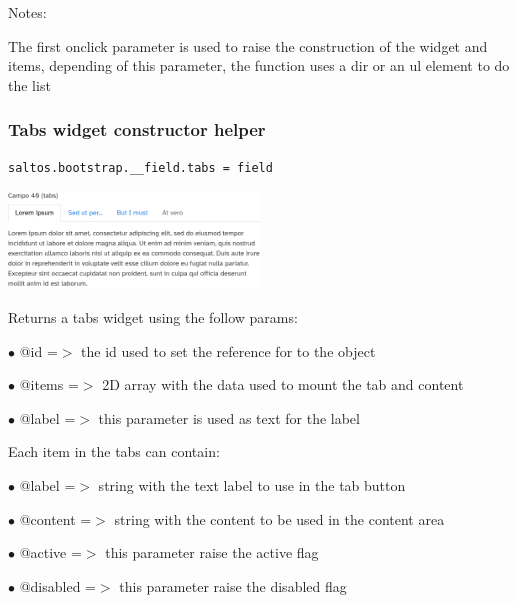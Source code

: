 \documentclass[a4paper]{article}
\begin{document}
Notes:

The first onclick parameter is used to raise the construction of the widget and items,
depending of this parameter, the function uses a dir or an ul element to do the list

\hypertarget{toc87}{}
\subsubsection{Tabs widget constructor helper}

\begin{lstlisting}
saltos.bootstrap.__field.tabs = field
\end{lstlisting}

\begin{center}\includegraphics[width=0.5\textwidth]{../ujest/snaps/test-bootstrap-js-bootstrap-campo-40-tabs-1-snap.png}\end{center}

Returns a tabs widget using the follow params:

\begin{compactitem}
\item[\color{myblue}$\bullet$] @id    =$>$ the id used to set the reference for to the object
\item[\color{myblue}$\bullet$] @items =$>$ 2D array with the data used to mount the tab and content
\item[\color{myblue}$\bullet$] @label    =$>$ this parameter is used as text for the label
\end{compactitem}

Each item in the tabs can contain:

\begin{compactitem}
\item[\color{myblue}$\bullet$] @label    =$>$ string with the text label to use in the tab button
\item[\color{myblue}$\bullet$] @content  =$>$ string with the content to be used in the content area
\item[\color{myblue}$\bullet$] @active   =$>$ this parameter raise the active flag
\item[\color{myblue}$\bullet$] @disabled =$>$ this parameter raise the disabled flag
\end{compactitem}
\end{document}
